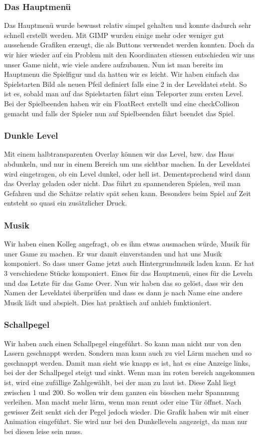 \documentclass[12pt,a4paper]{scrartcl}
\begin{document}
 	
\subsubsection{Das Hauptmenü} 	
Das Hauptmenü wurde bewusst relativ simpel gehalten und konnte dadurch sehr schnell erstellt werden. Mit GIMP wurden 	
einige mehr oder weniger gut aussehende Grafiken erzeugt, die als Buttons verwendet werden konnten. Doch da wir hier wieder auf ein Problem mit den Koordinaten stiessen entschieden wir uns unser Game nicht, wie viele andere aufzubauen. Nun ist man bereits im Hauptmenu die Spielfigur und da hatten wir es leicht. Wir haben einfach das Spielstarten Bild als neuen Pfeil definiert falls eine 2 in der Leveldatei steht. So ist es, sobald man auf das Spielstarten fährt einn Teleporter zum ersten Level. Bei der Spielbeenden haben wir ein FloatRect erstellt und eine checkCollison gemacht und falls der Spieler nun auf Spielbeenden fährt beendet das Spiel. 	
 	
 	
\subsubsection{Dunkle Level} 	
Mit einem halbtransparenten Overlay können wir das Level, bzw. das Haus abdunkeln, und nur in einem Bereich um uns 	
sichtbar machen. In der Leveldatei wird eingetragen, ob ein Level dunkel, oder hell ist. Dementsprechend wird dann das 	
Overlay geladen oder nicht. Das führt zu spannenderen Spielen, weil man Gefahren und die Schätze relativ spät sehen kann. 	
Besonders beim Spiel auf Zeit entsteht so quasi ein zusätzlicher Druck. 	
 	
\subsubsection{Musik} 	
Wir haben einen Kolleg angefragt, ob es ihm etwas ausmachen würde, Musik für uner Game zu machen. Er war damit einverstanden und hat uns Musik komponiert. So dass unser Game jetzt auch Hintergrundmusik laden kann. Er hat 3 verschiedene Stücke komponiert. Eines für das Hauptmenü, eines für die Leveln und das Letzte für das Game Over. Nun wir haben das so gelöst, dass wir den Namen der Leveldatei überprüfen und dass es dann je nach Name eine andere Musik lädt und abspielt. Dies hat praktisch auf anhieb funktioniert. 	
	
\subsubsection{Schallpegel} 	
Wir haben auch einen Schallpegel eingeführt. So kann man nicht nur von den Lasern geschnappt werden. Sondern man kann auch zu viel Lärm machen und so geschnappt werden. Damit man sieht wie knapp es ist, hat es eine Anzeige links, bei der der Schallpegel steigt und sinkt. Wenn man im roten bereich angekommen ist, wird eine zufällige Zahlgewählt, bei der man zu laut ist. Diese Zahl liegt zwischen 1 und 200. So wollen wir dem ganzen ein bisschen mehr Spannnung verleihen. Man macht mehr lärm, wenn man rennt oder eine Tür öffnet. Nach gewisser Zeit senkt sich der Pegel jedoch wieder. Die Grafik haben wir mit einer Animation eingeführt. Sie wird nur bei den Dunkelleveln angezeigt, da man nur bei diesen leise sein muss.
 	
\end{document}
